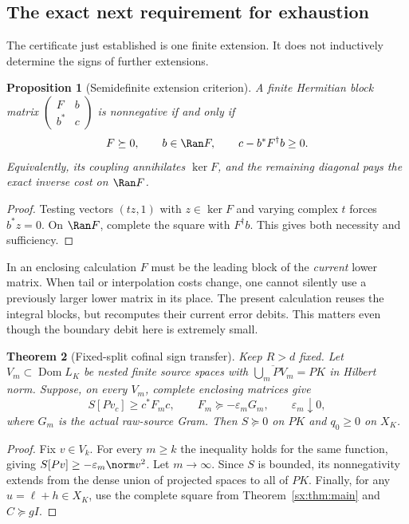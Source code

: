 \documentclass[11pt,a4paper]{article}
\numberwithin{equation}{section}
\newtheorem{theorem}{Theorem}[section]
\newtheorem{proposition}[theorem]{Proposition}
\theoremstyle{definition}\newtheorem{definition}[theorem]{Definition}
\theoremstyle{remark}\newtheorem{remark}[theorem]{Remark}
\begin{document}
\subsection{The exact next requirement for exhaustion}
The certificate just established is one finite extension. It does not
inductively determine the signs of further extensions.

\begin{proposition}[Semidefinite extension criterion]\label{sx:prop:extension}
A finite Hermitian block matrix
$\left(\begin{smallmatrix}F&b\\b^*&c\end{smallmatrix}\right)$ is nonnegative
if and only if
\[
 F\succeq0,\qquad b\in\Ran F,\qquad c-b^*F^\dagger b\ge0.
\]
Equivalently, its coupling annihilates $\ker F$, and the remaining
diagonal pays the exact inverse cost on $\Ran F$.
\end{proposition}
\begin{proof}
Testing vectors $(tz,1)$ with $z\in\ker F$ and varying complex $t$
forces $b^*z=0$. On $\Ran F$, complete the square with $F^\dagger b$.
This gives both necessity and sufficiency.
\end{proof}
In an enclosing calculation $F$ must be the leading block of the
\emph{current} lower matrix. When tail or interpolation costs change,
one cannot silently use a previously larger lower matrix in its place.
The present calculation reuses the integral blocks, but recomputes
their current error debits. This matters even though the boundary debit
here is extremely small.

\begin{theorem}[Fixed-split cofinal sign transfer]\label{sx:thm:cofinal}
Keep $R>d$ fixed. Let $V_m\subset\operatorname{Dom}L_K$ be nested
finite source spaces with $\overline{\bigcup_mPV_m}=PK$ in Hilbert norm.
Suppose, on every $V_m$, complete enclosing matrices give
\[
 S[Pv_c]\ge c^*F_mc,\qquad
 F_m\succeq-\varepsilon_mG_m,\qquad\varepsilon_m\downarrow0,
\]
where $G_m$ is the actual raw-source Gram. Then $S\succeq0$ on $PK$
and $q_0\ge0$ on $X_K$.
\end{theorem}
\begin{proof}
Fix $v\in V_k$. For every $m\ge k$ the inequality holds for the same
function, giving $S[Pv]\ge-\varepsilon_m\norm v^2$. Let $m\to\infty$.
Since $S$ is bounded, its nonnegativity extends from the dense union
of projected spaces to all of $PK$. Finally, for any
$u=\ell+h\in X_K$, use the complete square from
Theorem~\ref{sx:thm:main} and $C\succeq gI$.
\end{proof}
\end{document}
